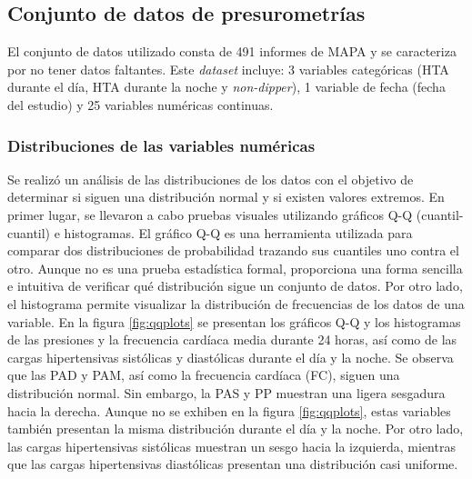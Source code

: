 \subsection{Conjunto de datos de presurometrías}
\label{sec:Conjunto1}

El conjunto de datos utilizado consta de 491 informes de MAPA y se caracteriza por no tener datos faltantes. 
Este \emph{dataset} incluye: 3 variables categóricas (HTA durante el día, HTA durante la noche y \emph{non-dipper}), 
1 variable de fecha (fecha del estudio) y 25 variables numéricas continuas.


\subsubsection{Distribuciones de las variables numéricas}
Se realizó un análisis de las distribuciones de los datos con el objetivo de determinar si siguen una distribución 
normal y si existen valores extremos. En primer lugar, se llevaron a cabo pruebas visuales utilizando gráficos Q-Q 
(cuantil-cuantil) e histogramas. El gráfico Q-Q es una herramienta utilizada para comparar dos distribuciones de 
probabilidad trazando sus cuantiles uno contra el otro. Aunque no es una prueba estadística formal, proporciona 
una forma sencilla e intuitiva de verificar qué distribución sigue un conjunto de datos. Por otro lado, el 
histograma permite visualizar la distribución de frecuencias de los datos de una variable. En la figura \ref{fig:qqplots} 
se presentan los gráficos Q-Q y los histogramas de las presiones y la frecuencia cardíaca media durante 24 horas, 
así como de las cargas hipertensivas sistólicas y diastólicas durante el día y la noche. Se observa que las PAD y 
PAM, así como la frecuencia cardíaca (FC), siguen una distribución normal. Sin embargo, la PAS y PP muestran una 
ligera sesgadura hacia la derecha. Aunque no se exhiben en la figura \ref{fig:qqplots}, estas variables también presentan la misma 
distribución durante el día y la noche. Por otro lado, las cargas hipertensivas sistólicas muestran un sesgo hacia 
la izquierda, mientras que las cargas hipertensivas diastólicas presentan una distribución casi uniforme.

